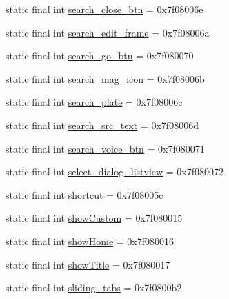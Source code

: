 \begin{CompactItemize}
\item 
static final int \hyperlink{classandroid_1_1support_1_1v7_1_1recyclerview_1_1_r_1_1id_b036192a10eb003101f437fc4ecdf9cd}{search\_\-close\_\-btn} = 0x7f08006e
\item 
static final int \hyperlink{classandroid_1_1support_1_1v7_1_1recyclerview_1_1_r_1_1id_47dc76d2602c0b9966f0a38699db415f}{search\_\-edit\_\-frame} = 0x7f08006a
\item 
static final int \hyperlink{classandroid_1_1support_1_1v7_1_1recyclerview_1_1_r_1_1id_263323225c173f29e2d543adeedbff2a}{search\_\-go\_\-btn} = 0x7f080070
\item 
static final int \hyperlink{classandroid_1_1support_1_1v7_1_1recyclerview_1_1_r_1_1id_18a9c9b7910d82dcebe3a8530e75801a}{search\_\-mag\_\-icon} = 0x7f08006b
\item 
static final int \hyperlink{classandroid_1_1support_1_1v7_1_1recyclerview_1_1_r_1_1id_b007e3c6379c620b71eebc836e5b51f2}{search\_\-plate} = 0x7f08006c
\item 
static final int \hyperlink{classandroid_1_1support_1_1v7_1_1recyclerview_1_1_r_1_1id_5f4f8150ea360f3fba20d3ed56d3329f}{search\_\-src\_\-text} = 0x7f08006d
\item 
static final int \hyperlink{classandroid_1_1support_1_1v7_1_1recyclerview_1_1_r_1_1id_ee3f690c2dd481fedf72e390ae092e4c}{search\_\-voice\_\-btn} = 0x7f080071
\item 
static final int \hyperlink{classandroid_1_1support_1_1v7_1_1recyclerview_1_1_r_1_1id_e550b2c35b4071ed768d5ff8f10b5bb7}{select\_\-dialog\_\-listview} = 0x7f080072
\item 
static final int \hyperlink{classandroid_1_1support_1_1v7_1_1recyclerview_1_1_r_1_1id_61888db4495d55b9941ec0fe3cced822}{shortcut} = 0x7f08005c
\item 
static final int \hyperlink{classandroid_1_1support_1_1v7_1_1recyclerview_1_1_r_1_1id_ad1568a10b7e189c8cf1df6acc51a58e}{showCustom} = 0x7f080015
\item 
static final int \hyperlink{classandroid_1_1support_1_1v7_1_1recyclerview_1_1_r_1_1id_eafd37d75c104153d0448e732e734b87}{showHome} = 0x7f080016
\item 
static final int \hyperlink{classandroid_1_1support_1_1v7_1_1recyclerview_1_1_r_1_1id_c461d5c1f707b6ef6fc3d8dfecb46442}{showTitle} = 0x7f080017
\item 
static final int \hyperlink{classandroid_1_1support_1_1v7_1_1recyclerview_1_1_r_1_1id_af9d98b62f8e0bc47f3c8d99e304329e}{sliding\_\-tabs} = 0x7f0800b2
\item 

\end{CompactItemize}
